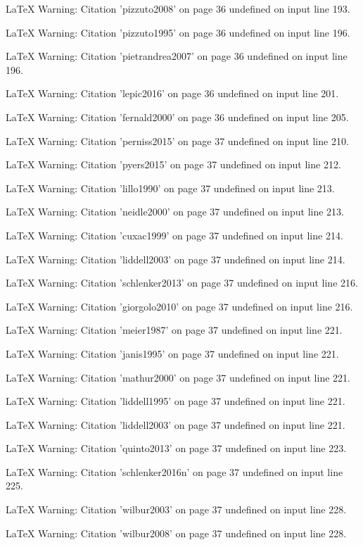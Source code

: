 LaTeX Warning: Citation 'pizzuto2008' on page 36 undefined on input line 193.


LaTeX Warning: Citation 'pizzuto1995' on page 36 undefined on input line 196.


LaTeX Warning: Citation 'pietrandrea2007' on page 36 undefined on input line 196.


LaTeX Warning: Citation 'lepic2016' on page 36 undefined on input line 201.


LaTeX Warning: Citation 'fernald2000' on page 36 undefined on input line 205.


LaTeX Warning: Citation 'perniss2015' on page 37 undefined on input line 210.


LaTeX Warning: Citation 'pyers2015' on page 37 undefined on input line 212.


LaTeX Warning: Citation 'lillo1990' on page 37 undefined on input line 213.


LaTeX Warning: Citation 'neidle2000' on page 37 undefined on input line 213.


LaTeX Warning: Citation 'cuxac1999' on page 37 undefined on input line 214.


LaTeX Warning: Citation 'liddell2003' on page 37 undefined on input line 214.


LaTeX Warning: Citation 'schlenker2013' on page 37 undefined on input line 216.


LaTeX Warning: Citation 'giorgolo2010' on page 37 undefined on input line 216.


LaTeX Warning: Citation 'meier1987' on page 37 undefined on input line 221.


LaTeX Warning: Citation 'janis1995' on page 37 undefined on input line 221.


LaTeX Warning: Citation 'mathur2000' on page 37 undefined on input line 221.


LaTeX Warning: Citation 'liddell1995' on page 37 undefined on input line 221.


LaTeX Warning: Citation 'liddell2003' on page 37 undefined on input line 221.


LaTeX Warning: Citation 'quinto2013' on page 37 undefined on input line 223.


LaTeX Warning: Citation 'schlenker2016n' on page 37 undefined on input line 225.


LaTeX Warning: Citation 'wilbur2003' on page 37 undefined on input line 228.


LaTeX Warning: Citation 'wilbur2008' on page 37 undefined on input line 228.


